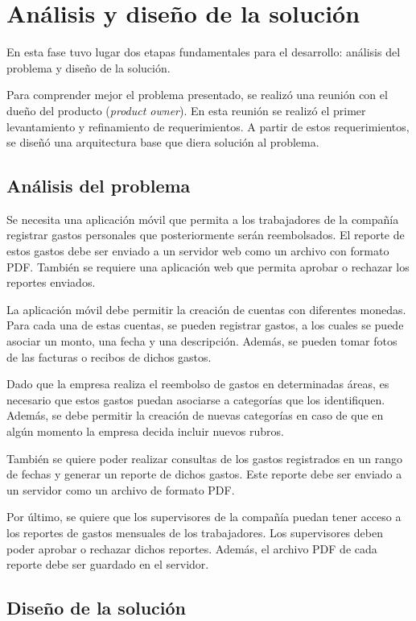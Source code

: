 \section{Análisis y diseño de la solución} \label{sect:Diseno}

En esta fase tuvo lugar dos etapas fundamentales para el desarrollo: análisis del problema y diseño de la solución.

Para comprender mejor el problema presentado, se realizó una reunión con el dueño del producto (\textit{product owner}). En esta reunión se realizó el primer levantamiento y refinamiento de requerimientos. A partir de estos requerimientos, se diseñó una arquitectura base que diera solución al problema.

\subsection{Análisis del problema}

Se necesita una aplicación móvil que permita a los trabajadores de la compañía registrar gastos personales que posteriormente serán reembolsados. El reporte de estos gastos debe ser enviado a un servidor web como un archivo con formato PDF. También se requiere una aplicación web que permita aprobar o rechazar los reportes enviados.

La aplicación móvil debe permitir la creación de cuentas con diferentes monedas. Para cada una de estas cuentas, se pueden registrar gastos, a los cuales se puede asociar un monto, una fecha y una descripción. Además, se pueden tomar fotos de las facturas o recibos de dichos gastos.

Dado que la empresa realiza el reembolso de gastos en determinadas áreas, es necesario que estos gastos puedan asociarse a categorías que los identifiquen. Además, se debe permitir la creación de nuevas categorías en caso de que en algún momento la empresa decida incluir nuevos rubros.

También se quiere poder realizar consultas de los gastos registrados en un rango de fechas y generar un reporte de dichos gastos. Este reporte debe ser enviado a un servidor como un archivo de formato PDF.

Por último, se quiere que los supervisores de la compañía puedan tener acceso a los reportes de gastos mensuales de los trabajadores. Los supervisores deben poder aprobar o rechazar dichos reportes. Además, el archivo PDF de cada reporte debe ser guardado en el servidor.

\subsection{Diseño de la solución}

